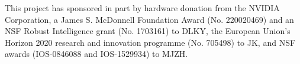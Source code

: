 This project has sponsored in part by hardware donation from the NVIDIA Corporation, a James S. McDonnell Foundation Award (No. 220020469) and an NSF Robust Intelligence grant (No. 1703161) to DLKY, the European Union's Horizon 2020 research and innovation programme (No. 705498) to JK, and NSF awards (IOS-0846088 and IOS-1529934) to MJZH. 
